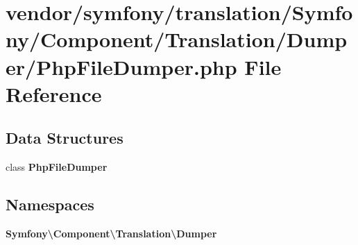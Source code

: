 \section{vendor/symfony/translation/\+Symfony/\+Component/\+Translation/\+Dumper/\+Php\+File\+Dumper.php File Reference}
\label{_php_file_dumper_8php}
\subsection*{Data Structures}
\begin{DoxyCompactItemize}
\item 
class {\bf Php\+File\+Dumper}
\end{DoxyCompactItemize}
\subsection*{Namespaces}
\begin{DoxyCompactItemize}
\item 
 {\bf Symfony\textbackslash{}\+Component\textbackslash{}\+Translation\textbackslash{}\+Dumper}
\end{DoxyCompactItemize}
